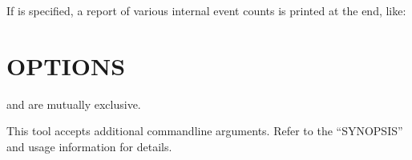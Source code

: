 \documentclass[letterpaper,10pt,english]{sphinxmanual}
\begin{document}
\sphinxAtStartPar
If {\hyperref[\detokenize{mariadb-schema-change:cmdoption-mariadb-schema-change-statistics}]{}} is specified, a report of various internal event counts
is printed at the end, like:

\begin{sphinxVerbatim}[commandchars=\\\{\}]
\end{sphinxVerbatim}


\section{OPTIONS}
\label{\detokenize{mariadb-schema-change:options}}
\sphinxAtStartPar
{\hyperref[\detokenize{mariadb-schema-change:cmdoption-mariadb-schema-change-dry-run}]{}} and {\hyperref[\detokenize{mariadb-schema-change:cmdoption-mariadb-schema-change-execute}]{}} are mutually exclusive.

\sphinxAtStartPar
This tool accepts additional command\sphinxhyphen{}line arguments.  Refer to the
“SYNOPSIS” and usage information for details.
\end{document}
